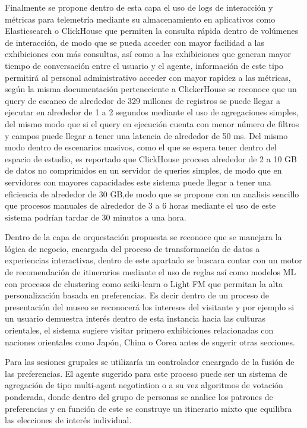\documentclass[pdflatex,sn-mathphys-num]{sn-jnl}%
\theoremstyle{thmstyleone}%
\theoremstyle{thmstyletwo}%
\theoremstyle{thmstylethree}%
\begin{document}
Finalmente se propone dentro de esta capa el uso de logs de interacción y métricas para telemetría mediante su almacenamiento en aplicativos como Elasticsearch o ClickHouse que permiten la consulta rápida dentro de volúmenes de interacción, de modo que se pueda acceder con mayor facilidad a las exhibiciones con más consultas, así como a las exhibiciones que generan mayor tiempo de conversación entre el usuario y el agente, información de este tipo permitirá al personal administrativo acceder con mayor rapidez a las métricas, según la misma documentación perteneciente a ClickerHouse se reconoce que un query de escaneo de alrededor de 329 millones de registros se puede llegar a ejecutar en alrededor de 1 a 2 segundos mediante el uso de agregaciones simples, del mismo modo que si el query en ejecución cuenta con menor número de filtros y campos puede llegar a tener una latencia de alrededor  de 50 ms. Del mismo modo dentro de escenarios masivos, como el que se espera tener dentro del espacio de estudio, es reportado que ClickHouse procesa alrededor de 2 a 10 GB de datos no comprimidos en un servidor de queries simples, de modo que en servidores con mayores capacidades este sistema puede llegar a tener una eficiencia de alrededor de 30 GB,\cite{clickhouse_query_optimization}de modo que se propone con un analisis sencillo que procesos manuales de alrededor de 3 a 6 horas mediante el uso de este sistema podrían tardar de 30 minutos a una hora.

Dentro de la capa de orquestación propuesta se reconoce que se manejara la lógica de negocio, encargada del proceso de transformación de datos a experiencias interactivas, dentro de este apartado se buscara contar con un motor de recomendación de itinerarios mediante el uso de reglas así como modelos ML con procesos de clustering como sciki-learn o Light FM que permitan la alta personalización basada en preferencias. Es decir dentro de un proceso de presentación del museo se reconocerá los intereses del visitante y por ejemplo si un usuario demuestra interés dentro de esta instancia hacia las culturas orientales, el sistema sugiere visitar primero exhibiciones relacionadas con naciones orientales como Japón, China o Corea antes de sugerir otras secciones.

Para las sesiones grupales se utilizaría un controlador encargado de la fusión de las preferencias. El agente sugerido para este proceso puede ser un sistema de agregación de tipo multi-agent negotiation o a su vez algoritmos de votación ponderada, donde dentro del grupo de personas se analice los patrones de preferencias y en función de este se construye un itinerario mixto que equilibra las elecciones de interés individual.
\end{document}
